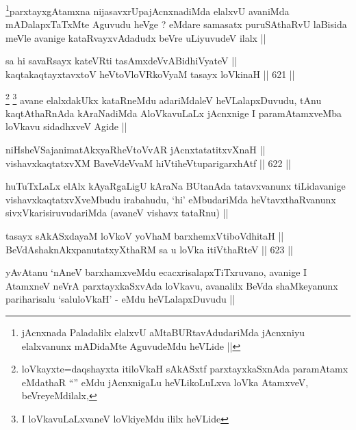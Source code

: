 \begin{artha}
\footnote{jAcnxnada Paladalilx elalxvU aMtaBURtavAdudariMda jAcnxniyu
  elalxvanunx mADidaMte AguvudeMdu heVLide ||}parxtayxgAtamxna nijasavxrUpajAcnxnadiMda elalxvU avaniMda
mADalapxTaTxMte Aguvudu heVge ? eMdare samasatx puruSAthaRvU laBisida
meVle avanige kataRvayxvAdadudx beVre uLiyuvudeV ilalx ||
\end{artha}


\begin{shl}
sa hi savaRsayx kateVRti tasAmxdeVvABidhiVyateV || \\
kaqtakaqtayxtavxtoV heVtoVloVRkoV\s yaM tasayx loVkinaH ||  621 ||  
\end{shl}

\begin{artha}
\footnote{loVkayxte=daqshayxta itiloVkaH sAkASxtf parxtayxkaSxnAda
  paramAtamx eMdathaR ``\stext'' eMdu jAcnxnigaLu heVLikoLuLxva loVka
  AtamxveV, beVreyeMdilalx,}
\footnote{I loVkavuLaLxvaneV loVkiyeMdu ililx heVLide}
avane elalxdakUkx kataRneMdu adariMdaleV heVLalapxDuvudu, tAnu
kaqtAthaRnAda kAraNadiMda AloVkavuLaLx jAcnxnige I paramAtamxveMba
loVkavu sidadhxveV Agide ||
\end{artha}


\begin{shl}
niHsheVSajanimatAkxyaRheVtoVvAR jAcnxtatatitxvXnaH || \\
vishavxkaqtatxvXM BaveVdeVvaM hiVtiheVtuparigarxhAtf ||  622 ||  
\end{shl}

\begin{artha}
huTuTxLaLx elAlx kAyaRgaLigU kAraNa BUtanAda tatavxvanunx tiLidavanige
vishavxkaqtatxvXveMbudu irabahudu, `hi' eMbudariMda heVtavxthaRvanunx
sivxVkarisiruvudariMda (avaneV vishavx tataRnu) ||
\end{artha}


\begin{shl}
tasayx sAkASxdayaM loVkoV yoV\s haM barxhemxVtiboVdhitaH || \\
BeVdAshaknAkxpanutatxyXthaRM sa u loVka itiVthaRteV ||  623 ||  
\end{shl}

\begin{artha}
yAvAtanu `nAneV barxhamxveMdu ecacxrisalapxTiTxruvano, avanige I
AtamxneV neVrA parxtayxkaSxvAda loVkavu, avanalilx BeVda shaMkeyanunx
pariharisalu `saluloVkaH' - eMdu heVLalapxDuvudu ||
\end{artha}

